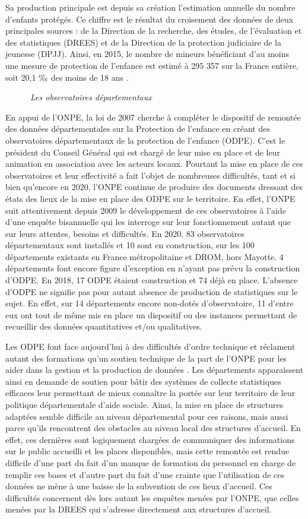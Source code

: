 \documentclass[
  12,
  a4paper,
]{report}
\begin{document}
Sa production principale est depuis sa création l'estimation annuelle du
nombre d'enfants protégés. Ce chiffre est le résultat du croisement des
données de deux principales sources : de la Direction de la recherche,
des études, de l'évaluation et des statistiques (DREES) et de la
Direction de la protection judiciaire de la jeunesse (DPJJ). Ainsi, en
2015, le nombre de mineurs bénéficiant d'au moins une mesure de
protection de l'enfance est estimé à 295 357 sur la France entière, soit
20,1 ‰ des moins de 18 ans .

~~~~~~\emph{Les observatoires départementaux}

En appui de l'ONPE, la loi de 2007 cherche à compléter le dispositif de
remontée des données départementales sur la Protection de l'enfance en
créant des observatoires départementaux de la protection de l'enfance
(ODPE). C'est le président du Conseil Général qui est chargé de leur
mise en place et de leur animation en association avec les acteurs
locaux. Pourtant la mise en place de ces observatoires et leur
effectivité a fait l'objet de nombreuses difficultés, tant et si bien
qu'encore en 2020, l'ONPE continue de produire des documents dressant
des états des lieux de la mise en place des ODPE sur le territoire. En
effet, l'ONPE suit attentivement depuis 2009 le développement de ces
observatoires à l'aide d'une enquête bisannuelle qui les interroge sur
leur fonctionnement autant que sur leurs attentes, besoins et
difficultés. En 2020, 83 observatoires départementaux sont installés et
10 sont en construction, sur les 100 départements existants en France
métropolitaine et DROM, hors Mayotte. 4 départements font encore figure
d'exception en n'ayant pas prévu la construction d'ODPE. En 2018, 17
ODPE étaient construction et 74 déjà en place. L'absence d'ODPE ne
signifie pas pour autant absence de production de statistiques sur le
sujet. En effet, sur 14 départements encore non-dotés d'observatoire, 11
d'entre eux ont tout de même mis en place un dispositif ou des instances
permettant de recueillir des données quantitatives et/ou qualitatives.

Les ODPE font face aujourd'hui à des difficultés d'ordre technique et
réclament autant des formations qu'un soutien technique de la part de
l'ONPE pour les aider dans la gestion et la production de données . Les
départements apparaissent ainsi en demande de soutien pour bâtir des
systèmes de collecte statistiques efficaces leur permettant de mieux
connaître la portée sur leur territoire de leur politique départementale
d'aide sociale. Ainsi, la mise en place de structures adaptées semble
difficile au niveau départemental pour ces raisons, mais aussi parce
qu'ils rencontrent des obstacles au niveau local des structures
d'accueil. En effet, ces dernières sont logiquement chargées de
communiquer des informations sur le public accueilli et les places
disponibles, mais cette remontée est rendue difficile d'une part du fait
d'un manque de formation du personnel en charge de remplir ces bases et
d'autre part du fait d'une crainte que l'utilisation de ces données ne
mène à une baisse de la subvention de ces lieux d'accueil. Ces
difficultés concernent dès lors autant les enquêtes menées par l'ONPE,
que celles menées par la DREES qui s'adresse directement aux structures
d'accueil.
\end{document}
